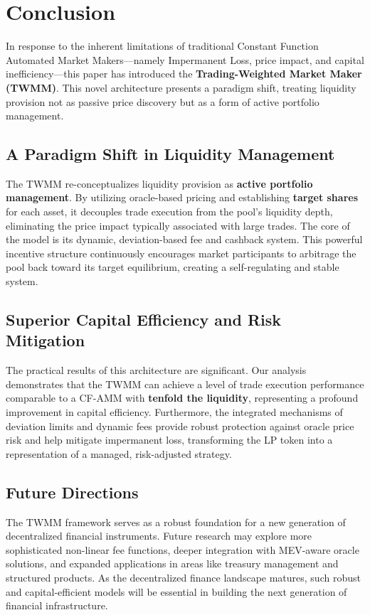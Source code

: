 \section*{Conclusion}

In response to the inherent limitations of traditional Constant Function Automated Market Makers---namely Impermanent Loss, price impact, and capital inefficiency---this paper has introduced the \textbf{Trading-Weighted Market Maker (TWMM)}. This novel architecture presents a paradigm shift, treating liquidity provision not as passive price discovery but as a form of active portfolio management.

\subsection*{A Paradigm Shift in Liquidity Management}

The TWMM re-conceptualizes liquidity provision as \textbf{active portfolio management}. By utilizing oracle-based pricing and establishing \textbf{target shares} for each asset, it decouples trade execution from the pool's liquidity depth, eliminating the price impact typically associated with large trades. The core of the model is its dynamic, deviation-based fee and cashback system. This powerful incentive structure continuously encourages market participants to arbitrage the pool back toward its target equilibrium, creating a self-regulating and stable system.

\subsection*{Superior Capital Efficiency and Risk Mitigation}

The practical results of this architecture are significant. Our analysis demonstrates that the TWMM can achieve a level of trade execution performance comparable to a CF-AMM with \textbf{tenfold the liquidity}, representing a profound improvement in capital efficiency. Furthermore, the integrated mechanisms of deviation limits and dynamic fees provide robust protection against oracle price risk and help mitigate impermanent loss, transforming the LP token into a representation of a managed, risk-adjusted strategy.

\subsection*{Future Directions}

The TWMM framework serves as a robust foundation for a new generation of decentralized financial instruments. Future research may explore more sophisticated non-linear fee functions, deeper integration with MEV-aware oracle solutions, and expanded applications in areas like treasury management and structured products. As the decentralized finance landscape matures, such robust and capital-efficient models will be essential in building the next generation of financial infrastructure. 

